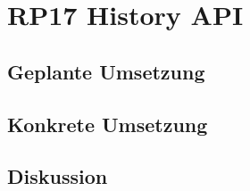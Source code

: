 \section{RP17 History API}
\label{sec:principle-rp17-history-api}

\subsection*{Geplante Umsetzung}


\subsection*{Konkrete Umsetzung}


\subsection*{Diskussion}
